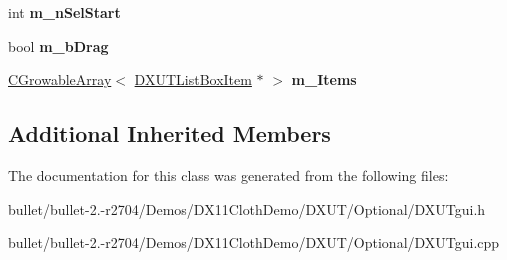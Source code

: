 \begin{DoxyCompactItemize}
\item 
\hypertarget{class_c_d_x_u_t_list_box_adfe5728a9319f94e542fd29d1c486956}{int {\bfseries m\+\_\+n\+Sel\+Start}}\label{class_c_d_x_u_t_list_box_adfe5728a9319f94e542fd29d1c486956}

\item 
\hypertarget{class_c_d_x_u_t_list_box_aae46a4317bf8f102b191caa817e0e113}{bool {\bfseries m\+\_\+b\+Drag}}\label{class_c_d_x_u_t_list_box_aae46a4317bf8f102b191caa817e0e113}

\item 
\hypertarget{class_c_d_x_u_t_list_box_a456b69c673c31180a482858cd812c2f4}{\hyperlink{class_c_growable_array}{C\+Growable\+Array}$<$ \hyperlink{struct_d_x_u_t_list_box_item}{D\+X\+U\+T\+List\+Box\+Item} $\ast$ $>$ {\bfseries m\+\_\+\+Items}}\label{class_c_d_x_u_t_list_box_a456b69c673c31180a482858cd812c2f4}

\end{DoxyCompactItemize}
\subsection*{Additional Inherited Members}


The documentation for this class was generated from the following files\+:\begin{DoxyCompactItemize}
\item 
bullet/bullet-\/2.-\/r2704/\+Demos/\+D\+X11\+Cloth\+Demo/\+D\+X\+U\+T/\+Optional/D\+X\+U\+Tgui.\+h\item 
bullet/bullet-\/2.-\/r2704/\+Demos/\+D\+X11\+Cloth\+Demo/\+D\+X\+U\+T/\+Optional/D\+X\+U\+Tgui.\+cpp\end{DoxyCompactItemize}

